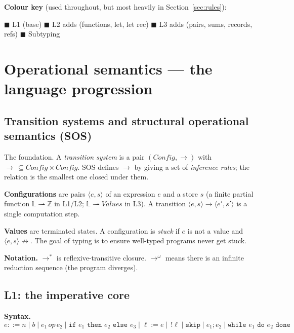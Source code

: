 \documentclass[11pt,a4paper]{article}
\newcommand{\Lone}[1]{{\color{l1color}#1}}
\newcommand{\Ltwo}[1]{{\color{l2color}#1}}
\newcommand{\Lthree}[1]{{\color{l3color}#1}}
\newcommand{\Lsub}[1]{{\color{subcolor}#1}}
\begin{document}
\textbf{Colour key} (used throughout, but most heavily in Section~\ref{sec:rules}):
\begin{center}
\Lone{$\blacksquare$ L1 (base)} \quad
\Ltwo{$\blacksquare$ L2 adds (functions, let, let rec)} \quad
\Lthree{$\blacksquare$ L3 adds (pairs, sums, records, refs)} \quad
\Lsub{$\blacksquare$ Subtyping}
\end{center}

\hrulefill

\section{Operational semantics --- the language progression}

\subsection{Transition systems and structural operational semantics (SOS)}

\begin{must}
The foundation. A \emph{transition system} is a pair $(\mathit{Config}, \to)$ with $\to\, \subseteq \mathit{Config} \times \mathit{Config}$. SOS defines $\to$ by giving a set of \emph{inference rules}; the relation is the smallest one closed under them.
\end{must}

\textbf{Configurations} are pairs $\langle e, s \rangle$ of an expression $e$ and a store $s$ (a finite partial function $\mathbb{L} \rightharpoonup \mathbb{Z}$ in L1/L2; $\mathbb{L} \rightharpoonup \mathit{Values}$ in L3). A transition $\langle e, s \rangle \to \langle e', s' \rangle$ is a single computation step.

\textbf{Values} are terminated states. A configuration is \emph{stuck} if $e$ is not a value and $\langle e, s\rangle \not\to$. The goal of typing is to ensure well-typed programs never get stuck.

\textbf{Notation.} $\to^*$ is reflexive-transitive closure. $\to^\omega$ means there is an infinite reduction sequence (the program diverges).

\subsection{L1: the imperative core}

\textbf{Syntax.}
\[ e ::= n \mid b \mid e_1 \, \mathit{op} \, e_2 \mid \texttt{if } e_1 \texttt{ then } e_2 \texttt{ else } e_3 \mid \ell := e \mid \,!\ell \mid \texttt{skip} \mid e_1 ; e_2 \mid \texttt{while } e_1 \texttt{ do } e_2 \texttt{ done} \]
\end{document}
